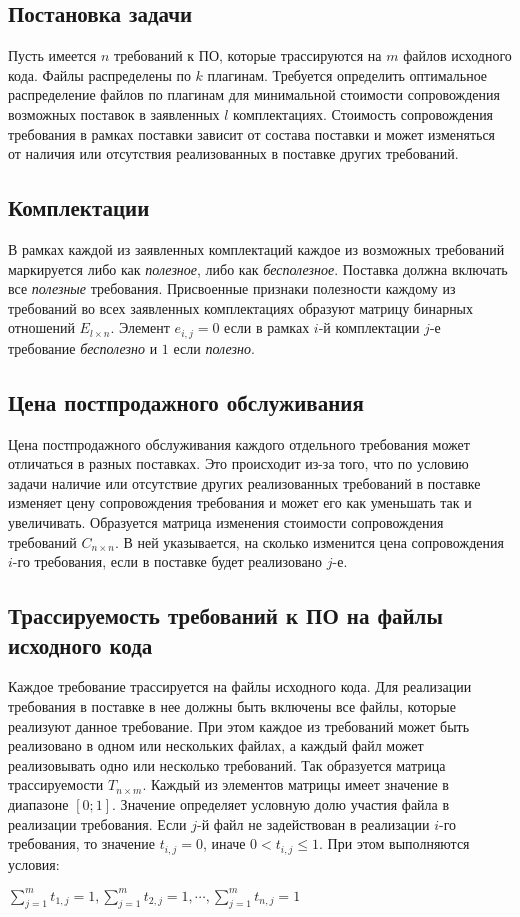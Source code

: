 \subsection*{Постановка задачи}
Пусть имеется $n$ требований к ПО, которые трассируются на $m$ файлов исходного кода. Файлы распределены по $k$ плагинам. Требуется определить оптимальное распределение файлов по плагинам для минимальной стоимости сопровождения возможных поставок в заявленных $l$ комплектациях. Стоимость сопровождения требования в рамках поставки зависит от состава поставки и может изменяться от наличия или отсутствия реализованных в поставке других требований.

\subsection*{Комплектации}
В рамках каждой из заявленных комплектаций каждое из возможных требований маркируется либо как \textit{полезное}, либо как \textit{бесполезное}. Поставка должна включать все \textit{полезные} требования. Присвоенные признаки полезности каждому из требований во всех заявленных комплектациях образуют матрицу бинарных отношений $E_{l \times n}$. Элемент $e_{i, j} = 0$ если в рамках $i$-й комплектации $j$-е требование \textit{бесполезно} и $1$ если \textit{полезно}.

\subsection*{Цена постпродажного обслуживания}
Цена постпродажного обслуживания каждого отдельного требования может отличаться в разных поставках. Это происходит из-за того, что по условию задачи наличие или отсутствие других реализованных требований в поставке изменяет цену сопровождения требования и может его как уменьшать так и увеличивать. Образуется матрица изменения стоимости сопровождения требований $C_{n \times n}$. В ней указывается, на сколько изменится цена сопровождения $i$-го требования, если в поставке будет реализовано $j$-е.

\subsection*{Трассируемость требований к ПО на файлы исходного кода}
Каждое требование трассируется на файлы исходного кода. Для реализации требования в поставке в нее должны быть включены все файлы, которые реализуют данное требование. При этом каждое из требований может быть реализовано в одном или нескольких файлах, а каждый файл может реализовывать одно или несколько требований. Так образуется матрица трассируемости $T_{n \times m}$. Каждый из элементов матрицы имеет значение в диапазоне $[0;1]$. Значение определяет условную долю участия файла в реализации требования. Если $j$-й файл не задействован в реализации $i$-го требования, то значение $t_{i, j} = 0$, иначе $0 < t_{i, j} \le 1$. При этом выполняются условия:
\begin{center}
  $\displaystyle \sum^{m}_{j = 1}t_{1, j} = 1, 
    \sum^{m}_{j = 1}t_{2, j} = 1, \cdots, \sum^{m}_{j = 1}t_{n, j} = 1$
\end{center}

